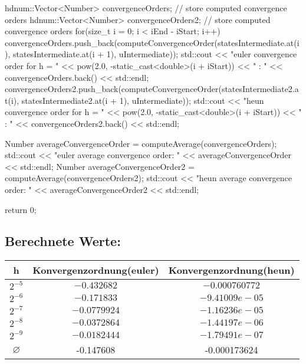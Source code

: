 \documentclass[10pt,oneside,a4paper]{scrartcl}
\begin{document}
\begin{cppcode}
{  hdnum::Vector<Number> convergenceOrders;     // store computed convergence orders
  hdnum::Vector<Number> convergenceOrders2;     // store computed convergence orders
  for(size_t i = 0; i < iEnd - iStart; i++) {
    convergenceOrders.push_back(computeConvergenceOrder(statesIntermediate.at(i), statesIntermediate.at(i + 1), uIntermediate));
    std::cout << "euler convergence order for h = " << pow(2.0, -static_cast<double>(i + iStart)) << " : " << convergenceOrders.back() << std::endl;
    convergenceOrders2.push_back(computeConvergenceOrder(statesIntermediate2.at(i), statesIntermediate2.at(i + 1), uIntermediate));
    std::cout << "heun convergence order for h = " << pow(2.0, -static_cast<double>(i + iStart)) << " : " << convergenceOrders2.back() << std::endl;
  }

  Number averageConvergenceOrder = computeAverage(convergenceOrders);
  std::cout << "euler average convergence order: " << averageConvergenceOrder << std::endl;
  Number averageConvergenceOrder2 = computeAverage(convergenceOrders2);
  std::cout << "heun average convergence order: " << averageConvergenceOrder2 << std::endl;

  return 0;
}
    \end{cppcode}
    
    \subsection*{Berechnete Werte:}
    
    \begin{center}
        \begin{tabular}[htbp]{c|c|c}
        h & Konvergenzordnung(euler) & Konvergenzordnung(heun) \\
        \hline
        $2^{-5}$ & $-0.432682$ & $-0.000760772$\\
        $2^{-6}$ & $-0.171833$ & $-9.41009e-05$\\
        $2^{-7}$ & $-0.0779924$ & $-1.16236e-05$\\
        $2^{-8}$ & $-0.0372864$ & $-1.44197e-06$\\
        $2^{-9}$ & $-0.0182444$ & $-1.79491e-07$\\
        \hline
        \hline
        $\varnothing$ & -0.147608 & -0.000173624
        \end{tabular}
    \end{center}
\end{document}
